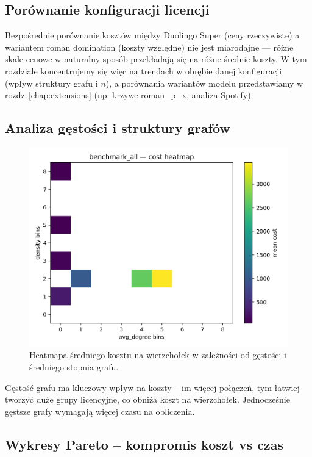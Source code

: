\subsection{Porównanie konfiguracji licencji}

Bezpośrednie porównanie kosztów między Duolingo Super (ceny rzeczywiste) a wariantem roman domination (koszty względne) nie jest miarodajne — różne skale cenowe w naturalny sposób przekładają się na różne średnie koszty. W tym rozdziale koncentrujemy się więc na trendach w obrębie danej konfiguracji (wpływ struktury grafu i \(n\)), a porównania wariantów modelu przedstawiamy w rozdz.\,\ref{chap:extensions} (np. krzywe roman\_p\_x, analiza Spotify).

\subsection{Analiza gęstości i struktury grafów}

\begin{figure}[H]
  \centering
  \includegraphics[width=0.7\linewidth]{assets/figures/ba_heatmap_cost.png}
  \caption{Heatmapa średniego kosztu na wierzchołek w zależności od gęstości i średniego stopnia grafu.}
  \label{fig:density_heatmap}
\end{figure}


Gęstość grafu ma kluczowy wpływ na koszty -- im więcej połączeń, tym łatwiej tworzyć duże grupy licencyjne, co obniża koszt na wierzchołek. Jednocześnie gęstsze grafy wymagają więcej czasu na obliczenia.

\subsection{Wykresy Pareto -- kompromis koszt vs czas}

